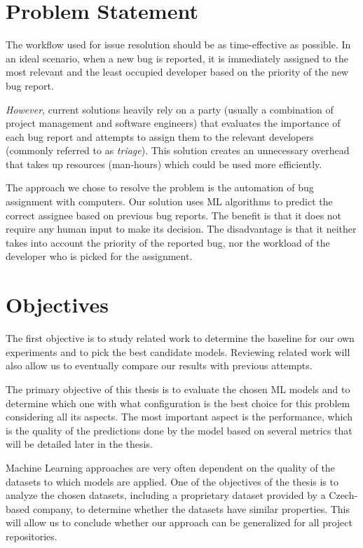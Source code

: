 \section{Problem Statement}

The workflow used for issue resolution should be as time-effective as possible. In an ideal scenario, when a new bug is reported, it is immediately assigned to the most relevant and the least occupied developer based on the priority of the new bug report.

\textit{However}, current solutions heavily rely on a party (usually a combination of project management and software engineers) that evaluates the importance of each bug report and attempts to assign them to the relevant developers (commonly referred to as \textit{triage}). This solution creates an unnecessary overhead that takes up resources (man-hours) which could be used more efficiently.

The approach we chose to resolve the problem is the automation of bug assignment with computers. Our solution uses ML algorithms to predict the correct assignee based on previous bug reports. The benefit is that it does not require any human input to make its decision. The disadvantage is that it neither takes into account the priority of the reported bug, nor the workload of the developer who is picked for the assignment.

\section{Objectives}

The first objective is to study related work to determine the baseline for our own experiments and to pick the best candidate models. Reviewing related work will also allow us to eventually compare our results with previous attempts.

The primary objective of this thesis is to evaluate the chosen ML models and to determine which one with what configuration is the best choice for this problem considering all its aspects. The most important aspect is the performance, which is the quality of the predictions done by the model based on several metrics that will be detailed later in the thesis.

Machine Learning approaches are very often dependent on the quality of the datasets to which models are applied. One of the objectives of the thesis is to analyze the chosen datasets, including a proprietary dataset provided by a Czech-based company, to determine whether the datasets have similar properties. This will allow us to conclude whether our approach can be generalized for all project repositories.

